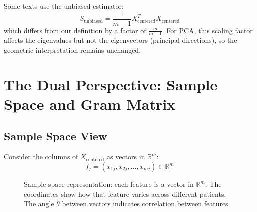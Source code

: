 \begin{notechapter}
\begin{remark}
Some texts use the unbiased estimator:
\[
S_{\text{unbiased}} = \frac{1}{m-1}X_{\text{centered}}^T X_{\text{centered}}
\]
which differs from our definition by a factor of $\frac{m}{m-1}$. For PCA, this scaling factor affects the eigenvalues but not the eigenvectors (principal directions), so the geometric interpretation remains unchanged.
\end{remark}

\section{The Dual Perspective: Sample Space and Gram Matrix}

\subsection{Sample Space View}

Consider the columns of $X_{\text{centered}}$ as vectors in $\mathbb{R}^m$:
\[
f_j = (x_{1j}, x_{2j}, \dots, x_{mj}) \in \mathbb{R}^m
\]

\begin{figure}[h]
\centering
{}
\caption{Sample space representation: each feature is a vector in $\mathbb{R}^m$. The coordinates show how that feature varies across different patients. The angle $\theta$ between vectors indicates correlation between features.}
\end{figure}


\end{notechapter}
